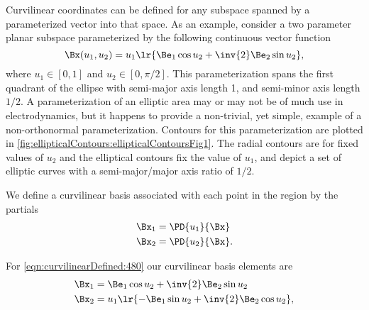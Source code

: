 %
%
Curvilinear coordinates can be defined for any subspace spanned by a parameterized vector into that space.
As an example, consider a two parameter planar subspace parameterized by the following continuous vector function
\begin{equation}\label{eqn:curvilinearDefined:480}
\Bx(u_1, u_2) = u_1 \lr{ \Be_1 \cos u_2 + \inv{2} \Be_2 \sin u_2 },
\end{equation}
where \( u_1 \in [0,1] \) and \( u_2 \in [0, \pi/2] \).
This parameterization spans the first quadrant of the ellipse with semi-major axis length 1, and semi-minor axis length \( 1/2 \).
A parameterization of an elliptic area may or may not be of much use in electrodynamics, but it happens to provide a non-trivial, yet simple, example of a non-orthonormal parameterization.
Contours for this parameterization are plotted in \cref{fig:ellipticalContours:ellipticalContoursFig1}.
The radial contours are for fixed values of \( u_2 \) and the elliptical contours fix the value of \( u_1 \), and depict a set of elliptic curves
with a semi-major/major axis ratio of \( 1/2 \).

We define a curvilinear basis associated with each point in the region by the partials
\begin{equation}\label{eqn:curvilinearDefined:80}
\begin{aligned}
\Bx_{1} &= \PD{u_1}{\Bx} \\
\Bx_{2} &= \PD{u_2}{\Bx}.
\end{aligned}
\end{equation}

For \cref{eqn:curvilinearDefined:480} our curvilinear basis elements are
\begin{equation}\label{eqn:curvilinearDefined:520}
\begin{aligned}
\Bx_1 &= \Be_1 \cos u_2 + \inv{2} \Be_2 \sin u_2 \\
\Bx_2 &= u_1 \lr{ - \Be_1 \sin u_2 + \inv{2} \Be_2 \cos u_2 },
\end{aligned}
\end{equation}

